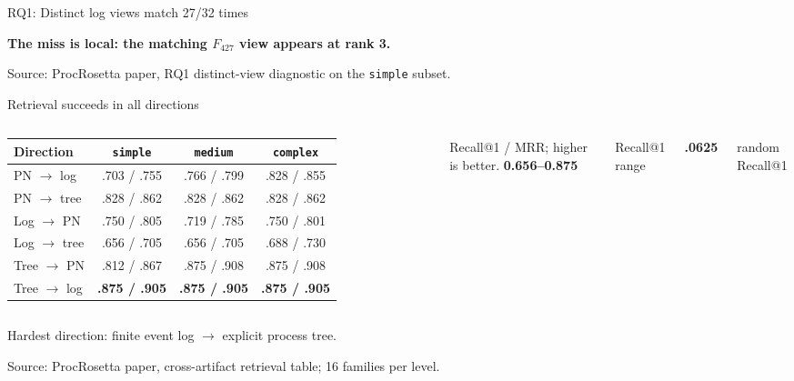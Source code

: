 \documentclass[aspectratio=169,12pt]{beamer}
\newcommand{\best}[1]{\textbf{#1}}
\newcommand{\paperfigure}[1]{%
  \begingroup
  \newenvironment{figure*}[1][]{\par\centering}{\par}
  \renewcommand{\caption}[1]{}
  \renewcommand{\label}[1]{}
  
  \endgroup
}
\newcommand{\source}[1]{\vfill{\tiny\color{prgray}Source: #1\par}}
\newcommand{\keyline}[1]{%
  \begin{center}
  \colorbox{prlightteal}{\parbox{0.91\textwidth}{\centering\bfseries\color{prnavy}#1}}
  \end{center}
}
\begin{document}
\begin{frame}[t]{RQ1: Distinct log views match 27/32 times}
  \vspace{-2mm}
  \begin{center}
    \begin{minipage}{0.96\textwidth}
      \paperfigure{figures/rq1-qualitative-retrieval}
    \end{minipage}
  \end{center}
  \vspace{-3mm}
  \keyline{The miss is local: the matching $F_{427}$ view appears at rank 3.}
  \source{ProcRosetta paper, RQ1 distinct-view diagnostic on the \texttt{simple} subset.}
\end{frame}

\begin{frame}[t]{Retrieval succeeds in all directions}
  \vspace{1mm}
  \begin{columns}[c,onlytextwidth]
      \centering
      \footnotesize
      \setlength{\tabcolsep}{4.2pt}
      \begin{tabular}{@{}lccc@{}}
        \toprule
        Direction & \texttt{simple} & \texttt{medium} & \texttt{complex} \\
        \midrule
        PN $\rightarrow$ log  & .703 / .755 & .766 / .799 & .828 / .855 \\
        PN $\rightarrow$ tree & .828 / .862 & .828 / .862 & .828 / .862 \\
        Log $\rightarrow$ PN  & .750 / .805 & .719 / .785 & .750 / .801 \\
        Log $\rightarrow$ tree & .656 / .705 & .656 / .705 & .688 / .730 \\
        Tree $\rightarrow$ PN & .812 / .867 & .875 / .908 & .875 / .908 \\
        Tree $\rightarrow$ log & \best{.875 / .905} & \best{.875 / .905} & \best{.875 / .905} \\
        \bottomrule
      \end{tabular}
      \par\vspace{1mm}
      {\scriptsize Recall@1 / MRR; higher is better.}
      {\fontsize{17}{20}\selectfont\bfseries\color{prteal}0.656--0.875}\par
      \small Recall@1 range\par\vspace{5mm}
      {\fontsize{20}{23}\selectfont\bfseries\color{prgray}.0625}\par
      \small random Recall@1
  \end{columns}
  \vspace{2mm}
  \centering
  \small Hardest direction: finite event log $\rightarrow$ explicit process tree.
  \source{ProcRosetta paper, cross-artifact retrieval table; 16 families per level.}
\end{frame}
\end{document}
